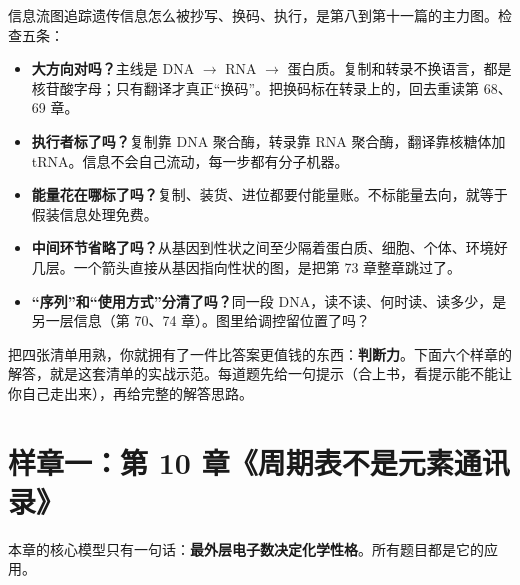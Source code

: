 信息流图追踪遗传信息怎么被抄写、换码、执行，是第八到第十一篇的主力图。检查五条：

\begin{itemize}[itemsep=2pt]
\item \textbf{大方向对吗？}主线是 DNA $\rightarrow$ RNA $\rightarrow$ 蛋白质。复制和转录不换语言，都是核苷酸字母；只有翻译才真正“换码”。把换码标在转录上的，回去重读第 68、69 章。
\item \textbf{执行者标了吗？}复制靠 DNA 聚合酶，转录靠 RNA 聚合酶，翻译靠核糖体加 tRNA。信息不会自己流动，每一步都有分子机器。
\item \textbf{能量花在哪标了吗？}复制、装货、进位都要付能量账。不标能量去向，就等于假装信息处理免费。
\item \textbf{中间环节省略了吗？}从基因到性状之间至少隔着蛋白质、细胞、个体、环境好几层。一个箭头直接从基因指向性状的图，是把第 73 章整章跳过了。
\item \textbf{“序列”和“使用方式”分清了吗？}同一段 DNA，读不读、何时读、读多少，是另一层信息（第 70、74 章）。图里给调控留位置了吗？
\end{itemize}

把四张清单用熟，你就拥有了一件比答案更值钱的东西：\textbf{判断力}。下面六个样章的解答，就是这套清单的实战示范。每道题先给一句提示（合上书，看提示能不能让你自己走出来），再给完整的解答思路。

\section{样章一：第 10 章《周期表不是元素通讯录》}

本章的核心模型只有一句话：\textbf{最外层电子数决定化学性格}。所有题目都是它的应用。

